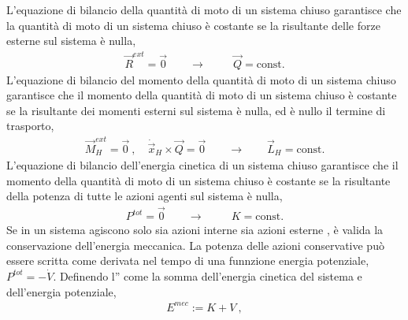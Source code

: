 \documentclass[letterpaper,10pt,italian]{jupyterBook}
\begin{document}
\sphinxAtStartPar
{}
L’equazione di bilancio della quantità di moto di un sistema chiuso garantisce che la quantità di moto di un sistema chiuso è costante se la risultante delle forze esterne sul sistema è nulla,
\begin{equation*}
\begin{split}
  \vec{R}^{ext} = \vec{0} \qquad  \rightarrow \qquad \ \ \vec{Q} = \text{const.} 
\end{split}
\end{equation*}
\sphinxAtStartPar
{}
L’equazione di bilancio del momento della quantità di moto di un sistema chiuso garantisce che il momento della quantità di moto di un sistema chiuso è costante se la risultante dei momenti esterni sul sistema è nulla, ed è nullo il termine di trasporto,
\begin{equation*}
\begin{split}
  \vec{M}_H^{ext} = \vec{0} \ , \quad \dot{\vec{x}}_H \times \vec{Q} = \vec{0} \qquad  \rightarrow \qquad \vec{L}_H = \text{const.}
\end{split}
\end{equation*}
\sphinxAtStartPar
{}
L’equazione di bilancio dell’energia cinetica di un sistema chiuso garantisce che il momento della quantità di moto di un sistema chiuso è costante se la risultante della potenza di tutte le azioni agenti sul sistema è nulla,
\begin{equation*}
\begin{split}
  P^{tot} = \vec{0} \qquad  \rightarrow \qquad \ \  K = \text{const.}
\end{split}
\end{equation*}
\sphinxAtStartPar
{} Se in un sistema agiscono solo {\hyperref[\detokenize{ch/mechanics/actions-conservative:physics-hs-mechanics-actions-conservative}]{}} \sphinxhyphen{} sia azioni interne sia azioni esterne \sphinxhyphen{}, è valida la conservazione dell’energia meccanica.
La potenza delle azioni conservative può essere scritta come derivata nel tempo di una funnzione energia potenziale, \(P^{tot} = - \dot{V}\).
Definendo l” come la somma dell’energia cinetica del sistema e dell’energia potenziale,
\begin{equation*}
\begin{split}E^{mec} := K + V \ ,\end{split}
\end{equation*}
\end{document}
